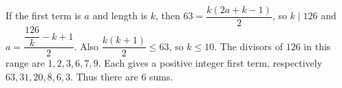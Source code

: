 If the first term is $a$ and length is $k$, then $63=\dfrac{k(2a+k-1)}{2}$, so $k\mid126$ and $a=\dfrac{\dfrac{126}{k}-k+1}{2}$. Also $\dfrac{k(k+1)}{2}\le63$, so $k\le10$. The divisors of $126$ in this range are $1,2,3,6,7,9$. Each gives a positive integer first term, respectively $63,31,20,8,6,3$. Thus there are $\boxed6$ sums.
